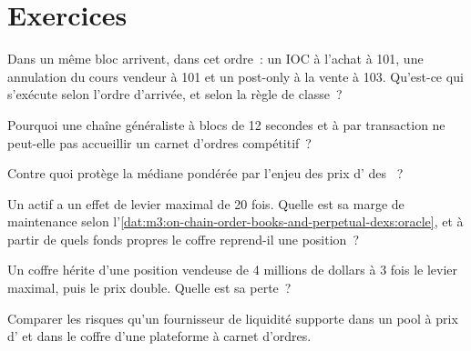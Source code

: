 \section{Exercices}

\begin{exercise}[$\star$]\label{exo:m3:on-chain-order-books-and-perpetual-dexs:1}
Dans un même bloc arrivent, dans cet ordre~: un IOC à l'achat à 101, une annulation du cours vendeur à 101 et un post-only à la vente à 103. Qu'est-ce qui s'exécute selon l'ordre d'arrivée, et selon la
règle de classe~?
\end{exercise}

\begin{exercise}[$\star$]\label{exo:m3:on-chain-order-books-and-perpetual-dexs:2}
Pourquoi une chaîne généraliste à blocs de 12 secondes et à  par transaction ne peut-elle pas accueillir un carnet d'ordres compétitif~?
\end{exercise}

\begin{exercise}[$\star$]\label{exo:m3:on-chain-order-books-and-perpetual-dexs:3}
Contre quoi protège la médiane pondérée par l'enjeu des prix d' des ~?
\end{exercise}

\begin{exercise}[$\star\star$]\label{exo:m3:on-chain-order-books-and-perpetual-dexs:4}
Un actif a un effet de levier maximal de 20 fois. Quelle est sa marge de maintenance selon l'\cref{dat:m3:on-chain-order-books-and-perpetual-dexs:oracle}, et
à partir de quels fonds propres le coffre reprend-il une position~?
\end{exercise}

\begin{exercise}[$\star\star$]\label{exo:m3:on-chain-order-books-and-perpetual-dexs:5}
Un coffre hérite d'une position vendeuse de 4 millions de dollars à 3 fois le levier maximal, puis le prix double. Quelle est sa perte~?
\end{exercise}

\begin{exercise}[$\star\star$]\label{exo:m3:on-chain-order-books-and-perpetual-dexs:6}
Comparer les risques qu'un fournisseur de liquidité supporte dans un pool à prix d' et dans le coffre d'une plateforme à carnet d'ordres.
\end{exercise}

